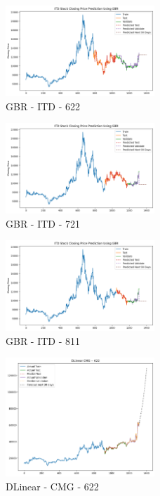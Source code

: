 \documentclass{ieeeojies}
\begin{document}
\begin{figure} [H]
    \centering
    \includegraphics[width=0.5\textwidth]{bibliography/Figure/GBR_ITD_622_90.png}
    \caption{GBR - ITD - 622}
    \label{fig:GBR_ITD_622_90}
\end{figure}
\begin{figure} [H]
    \centering
    \includegraphics[width=0.5\textwidth]{bibliography/Figure/GBR_ITD_721_90.png}
    \caption{GBR - ITD - 721}
    \label{fig:GBR_ITD_721_90}
\end{figure}
\begin{figure} [H]
    \centering
    \includegraphics[width=0.5\textwidth]{bibliography/Figure/GBR_ITD_811_90.png}
    \caption{GBR - ITD - 811}
    \label{fig:GBR_ITD_811_90}
\end{figure}
\begin{figure} [H]
    \centering
    \includegraphics[width=0.5\textwidth]{bibliography/Figure/DLinear_CMG_622_90.png}
    \caption{DLinear - CMG - 622}
    \label{fig:DLinear_CMG_622_90}
\end{figure}
\end{document}
